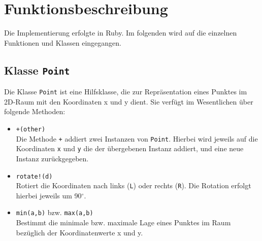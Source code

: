\documentclass[parskip=half,paper=a4]{scrartcl}
\begin{document}
  \section{Funktionsbeschreibung}
    Die Implementierung erfolgte in Ruby. Im folgenden wird auf die einzelnen
    Funktionen und Klassen eingegangen.
 
  \subsection{Klasse \lstinline-Point-}
    Die Klasse \lstinline-Point- ist eine Hilfsklasse, die zur Repräsentation eines
    Punktes im 2D-Raum mit den Koordinaten x und y dient.
    Sie verfügt im Wesentlichen über folgende Methoden:
    \begin{itemize}
      \item \lstinline-+(other)-\\
        Die Methode \lstinline-+- addiert zwei Instanzen von \lstinline-Point-. Hierbei
        wird jeweils auf die Koordinaten \lstinline-x- und \lstinline-y- die der
        übergebenen Instanz addiert, und eine neue Instanz zurückgegeben.
      \item \lstinline-rotate!(d)-\\
        Rotiert die Koordinaten nach links (\texttt{L}) oder rechts (\texttt{R}).
        Die Rotation erfolgt hierbei jeweils um 90$^\circ$.
      \item \lstinline-min(a,b)- bzw. \lstinline-max(a,b)-\\
        Bestimmt die minimale bzw. maximale Lage eines Punktes im Raum bezüglich
        der Koordinatenwerte x und y.
    \end{itemize}
    
\end{document}
